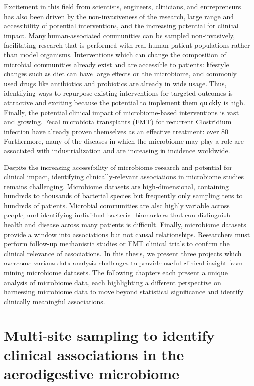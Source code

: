 Excitement in this field from scientists, engineers, clinicians, and entrepreneurs has also been driven by the non-invasiveness of the research, large range and accessibility of potential interventions, and the increasing potential for clinical impact.
Many human-associated communities can be sampled non-invasively, facilitating research that is performed with real human patient populations rather than model organisms.
Interventions which can change the composition of microbial communities already exist and are accessible to patients: lifestyle changes such as diet can have large effects on the microbiome, and commonly used drugs like antibiotics and probiotics are already in wide usage.
Thus, identifying ways to repurpose existing interventions for targeted outcomes is attractive and exciting because the potential to implement them quickly is high.
Finally, the potential clinical impact of microbiome-based interventions is vast and growing.
Fecal microbiota transplants (FMT) for recurrent Clostridium infection have already proven themselves as an effective treatment: over 80%
Furthermore, many of the diseases in which the microbiome may play a role are associated with industrialization and are increasing in incidence worldwide.

Despite the increasing accessibility of microbiome research and potential for clinical impact, identifying clinically-relevant associations in microbiome studies remains challenging.
Microbiome datasets are high-dimensional, containing hundreds to thousands of bacterial species but frequently only sampling tens to hundreds of patients.
Microbial communities are also highly variable across people, and identifying  individual bacterial biomarkers that can distinguish health and disease across many patients is difficult.
Finally, microbiome datasets provide a window into associations but not causal relationships.
Researchers must perform follow-up mechanistic studies or FMT clinical trials to confirm the clinical relevance of associations.
In this thesis, we present three projects which overcome various data analysis challenges to provide useful clinical insight from mining microbiome datasets.
The following chapters each present a unique analysis of microbiome data, each highlighting a different perspective on harnessing microbiome data to move beyond statistical significance and identify clinically meaningful associations.

\section{Multi-site sampling to identify clinical associations in the aerodigestive microbiome}

